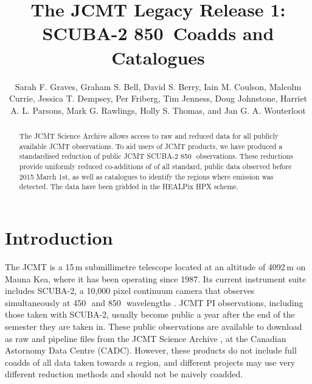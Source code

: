 \documentclass[twocolumn]{aastex6}
\newcommand{\um}{\micron}
\begin{document}
\title{The JCMT Legacy Release 1: SCUBA-2 850\micron\ Coadds and Catalogues}

\author{Sarah F. Graves,
     Graham S. Bell,
     David S. Berry,
     Iain M. Coulson,
     Malcolm Currie,
     Jessica T. Dempsey,
     Per Friberg,
     Tim Jenness,
     Doug Johnstone,
     Harriet A. L. Parsons,
     Mark G. Rawlings,
     Holly S. Thomas,
    and Jan G. A. Wouterloot
}

\begin{abstract}
  The JCMT Science Archive allows access to raw and reduced data for
  all publicly available JCMT observations. To aid users of JCMT
  products, we have produced a standardised reduction of public JCMT
  SCUBA-2 850\,\um\ observations. These reductions provide
  uniformly reduced co-additions of of all standard, public data
  observed before 2015 March 1st, as well as catalogues to identify
  the regions where emission was detected. The data have been gridded
  in the HEALPix HPX scheme.
\end{abstract}


\section{Introduction}

The JCMT is a 15\,m submillimetre telescope located at an altitude of
4092\,m on Mauna Kea, where it has been operating since 1987. Its
current instrument suite includes SCUBA-2, a 10,000 pixel continuum
camera that observes simultaneously at 450\,\um\ and 850\,\um\
wavelengths \citep{Holland2013}.  JCMT PI observations, including
those taken with SCUBA-2, usually become public a year after the end
of the semester they are taken in. These public observations are
available to download as raw and pipeline files from the
JCMT Science Archive \citep{2015Economou}, at the Canadian
Astornomy Data Centre (CADC). However, these products do not include
full coadds of all data taken towards a region, and different projects
may use very different reduction methods and should not be
naively coadded.
\end{document}
